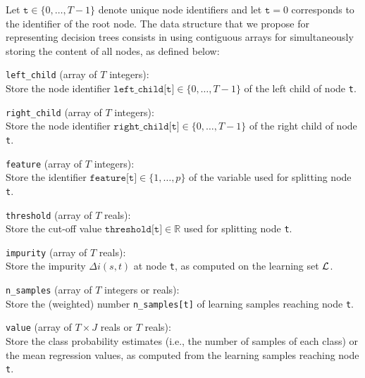 Let $\texttt{t}\in \{0,\dots,T-1\}$ denote unique node identifiers and let
$\texttt{t}=0$ corresponds to the identifier of the root node. The data
structure that we propose for representing decision trees consists in using
contiguous arrays for simultaneously storing the content of all nodes, as
defined below:

\begin{description}

\item \texttt{left\_child} (array of $T$ integers):\hfill\\
    Store the node identifier $\texttt{left\_child[t]} \in \{0,\dots,T-1\}$ of the left child of node \texttt{t}.
\item \texttt{right\_child} (array of $T$ integers):\hfill\\
    Store the node identifier $\texttt{right\_child[t]} \in \{0,\dots,T-1\}$ of the right child of node \texttt{t}.
\item \texttt{feature} (array of $T$ integers):\hfill\\
    Store the identifier $\texttt{feature[t]} \in \{1, \dots, p\}$ of the variable used for splitting  node \texttt{t}.
\item \texttt{threshold} (array of $T$ reals):\hfill\\
    Store the cut-off value $\texttt{threshold[t]} \in \mathbb{R}$ used for splitting  node \texttt{t}.
\item \texttt{impurity} (array of $T$ reals):\hfill\\
    Store the impurity $\Delta i(s,t)$ at node \texttt{t}, as computed on the learning set ${\cal L}$.
\item \texttt{n\_samples} (array of $T$ integers or reals):\hfill\\
    Store the (weighted) number \texttt{n\_samples[t]} of learning samples reaching node \texttt{t}.
\item \texttt{value} (array of $T\times J$ reals or $T$ reals):\hfill\\
    Store the class probability estimates (i.e., the number of samples of each class) or the mean regression values,
    as computed from the learning samples reaching node \texttt{t}.

\end{description}

